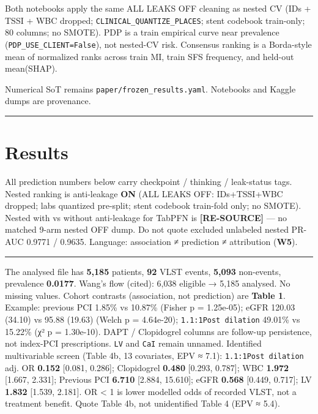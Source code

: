 \documentclass[
]{article}
\begin{document}
Both notebooks apply the same ALL LEAKS OFF cleaning as nested CV (IDs +
TSSI + WBC dropped; \texttt{CLINICAL\_QUANTIZE\_PLACES}; stent codebook
train-only; 80 columns; no SMOTE). PDP is a train empirical curve near
prevalence (\texttt{PDP\_USE\_CLIENT=False}), not nested-CV risk.
Consensus ranking is a Borda-style mean of normalized ranks across train
MI, train SFS frequency, and held-out mean(\textbar SHAP\textbar).

Numerical SoT remains \texttt{paper/frozen\_results.yaml}. Notebooks and
Kaggle dumps are provenance.

\begin{center}\rule{0.5\linewidth}{0.5pt}\end{center}

\section{Results}\label{results-1}

All prediction numbers below carry checkpoint / thinking / leak-status
tags. Nested ranking is anti-leakage \textbf{ON} (ALL LEAKS OFF:
IDs+TSSI+WBC dropped; labs quantized pre-split; stent codebook
train-fold only; no SMOTE). Nested with vs without anti-leakage for
TabPFN is \textbf{{[}RE-SOURCE{]}} --- no matched 9-arm nested OFF dump.
Do not quote excluded unlabeled nested PR-AUC 0.9771 / 0.9635. Language:
association ≠ prediction ≠ attribution (\textbf{W5}).

\begin{center}\rule{0.5\linewidth}{0.5pt}\end{center}

The analysed file has \textbf{5,185} patients, \textbf{92} VLST events,
\textbf{5,093} non-events, prevalence \textbf{0.0177}. Wang's flow
(cited): 6,038 eligible → 5,185 analysed. No missing values. Cohort
contrasts (association, not prediction) are \textbf{Table 1}. Example:
previous PCI 1.85\% vs 10.87\% (Fisher p = 1.25e-05); eGFR 120.03
(34.10) vs 95.88 (19.63) (Welch p = 4.64e-20);
\texttt{1.1:1Post\ dilation} 49.01\% vs 15.22\% (χ² p = 1.30e-10). DAPT
/ Clopidogrel columns are follow-up persistence, not index-PCI
prescriptions. \texttt{LV} and \texttt{CaI} remain unnamed. Identified
multivariable screen (Table 4b, 13 covariates, EPV ≈ 7.1):
\texttt{1.1:1Post\ dilation} adj. OR \textbf{0.152} {[}0.081, 0.286{]};
Clopidogrel \textbf{0.480} {[}0.293, 0.787{]}; WBC \textbf{1.972}
{[}1.667, 2.331{]}; Previous PCI \textbf{6.710} {[}2.884, 15.610{]};
eGFR \textbf{0.568} {[}0.449, 0.717{]}; LV \textbf{1.832} {[}1.539,
2.181{]}. OR \textless{} 1 is lower modelled odds of recorded VLST, not
a treatment benefit. Quote Table 4b, not unidentified Table 4 (EPV ≈
5.4).
\end{document}
